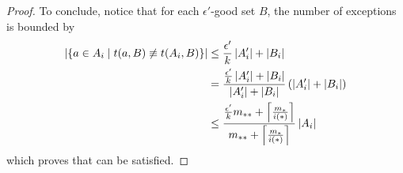 \begin{lemma}[Claim 5.14.2]
\begin{proof}
            To conclude, notice that for each $\epsilon'$-good set $B$, the number of exceptions is bounded by
            \begin{align*}
                \left| \left\{ a \in A_i \mid t(a, B) \not\equiv t(A_i, B) \right\} \right|
                    & \leq \frac{\epsilon'}{k} \left| A_i' \right| + \left| B_i \right| \\
                    & = \frac{\frac{\epsilon'}{k} \left| A_i' \right| + \left| B_i \right|}{\left| A_i' \right| + \left| B_i \right|}
                        \left( \left| A_i' \right| + \left| B_i \right| \right) \\
                    & \leq \frac{\frac{\epsilon'}{k} m_{**} + \left\lceil \frac{m_*}{i(*)} \right\rceil}{m_{**} + \left\lceil \frac{m_*}{i(*)} \right\rceil}
                        \left| A_i \right|
            \end{align*}
            which proves that  can be satisfied.
        \end{proof}
    \end{lemma}

